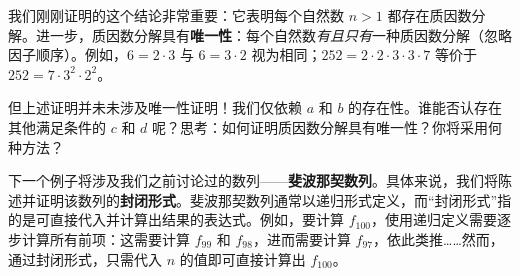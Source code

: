 我们刚刚证明的这个结论非常重要：它表明每个自然数 $n > 1$ 都存在质因数分解。进一步，质因数分解具有\textbf{唯一性}：每个自然数\emph{有且只有}一种质因数分解（忽略因子顺序）。例如，$6 = 2 \cdot 3$ 与 $6 = 3 \cdot 2$ 视为相同；$252 = 2 \cdot 2 \cdot 3 \cdot 3 \cdot 7$ 等价于 $252 = 7 \cdot 3^2 \cdot 2^2$。

但上述证明并未未涉及唯一性证明！我们仅依赖 $a$ 和 $b$ 的存在性。谁能否认存在其他满足条件的 $c$ 和 $d$ 呢？思考：如何证明质因数分解具有唯一性？你将采用何种方法？

下一个例子将涉及我们之前讨论过的数列——\textbf{斐波那契数列}。具体来说，我们将陈述并证明该数列的\textbf{封闭形式}。斐波那契数列通常以递归形式定义，而``封闭形式''指的是可直接代入并计算出结果的表达式。例如，要计算 $f_{100}$，使用递归定义需要逐步计算所有前项：这需要计算 $f_{99}$ 和 $f_{98}$，进而需要计算 $f_{97}$，依此类推……然而，通过封闭形式，只需代入 $n$ 的值即可直接计算出 $f_{100}$。\\

